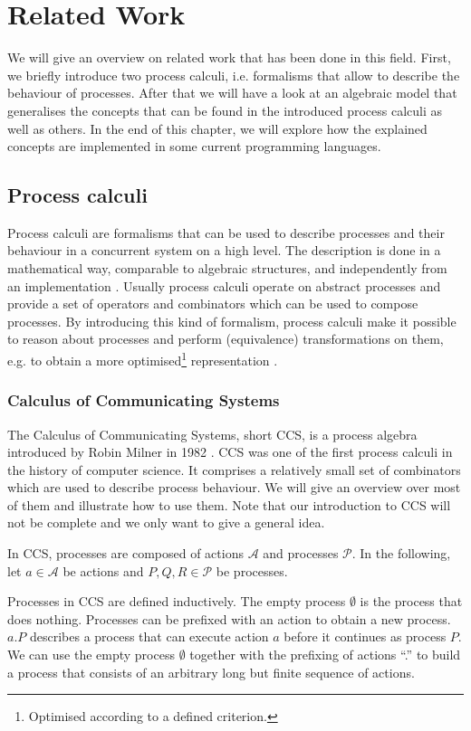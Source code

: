 \chapter{Related Work}
We will give an overview on related work that has been done in this field. First, we briefly introduce two process calculi, i.e. formalisms that allow to describe the behaviour of processes. After that we will have a look at an algebraic model that generalises the concepts that can be found in the introduced process calculi as well as others. In the end of this chapter, we will explore how the explained concepts are implemented in some current programming languages.

\section{Process calculi}
Process calculi are formalisms that can be used to describe processes and their behaviour in a concurrent system on a high level. The description is done in a mathematical way, comparable to algebraic structures, and independently from an implementation \cite{}. Usually process calculi operate on abstract processes and provide a set of operators and combinators which can be used to compose processes. By introducing this kind of formalism, process calculi make it possible to reason about processes and perform (equivalence) transformations on them, e.g. to obtain a more optimised\footnote{Optimised according to a defined criterion.} representation \cite{}.

\subsection{Calculus of Communicating Systems}
The Calculus of Communicating Systems, short \textsc{CCS}, is a process algebra introduced by Robin Milner in 1982 \cite{Milner:1982:CCS:539036}. \textsc{CCS} was one of the first process calculi in the history of computer science. It comprises a relatively small set of combinators which are used to describe process behaviour. We will give an overview over most of them and illustrate how to use them. Note that our introduction to \textsc{CCS} will not be complete and we only want to give a general idea.

In \textsc{CCS}, processes are composed of actions $\mathcal{A}$ and processes $\mathcal{P}$. In the following, let $a \in \mathcal{A}$ be actions and $P, Q, R \in \mathcal{P}$ be processes.

Processes in \textsc{CCS} are defined inductively. The empty process $\emptyset$ is the process that does nothing. Processes can be prefixed with an action to obtain a new process. $a.P$ describes a process that can execute action $a$ before it continues as process $P$. We can use the empty process $\emptyset$ together with the prefixing of actions \enquote{.} to build a process that consists of an arbitrary long but finite sequence of actions.

